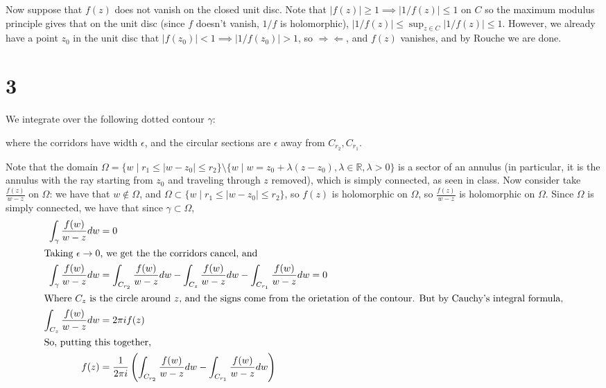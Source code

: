 \documentclass[12pt,letterpaper]{article}
\theoremstyle{definition}
\newcommand{\contra}{\Rightarrow\!\Leftarrow}
\newcommand{\R}{\mathbb{R}}
\newcommand{\incfig}[1]{}
\begin{document}
Now suppose that $f(z)$ does not vanish on the closed unit disc. Note that $|f(z)| \geq 1 \implies |1/f(z)| \leq 1$ on $C$ so the maximum modulus principle gives that on the unit disc (since $f$ doesn't vanish, $1/f$ is holomorphic), $|1/f(z)| \leq \sup_{z \in C}|1/f(z)| \leq 1$. However, we already have a point $z_{0}$ in the unit disc that $|f(z_{0})| < 1 \implies |1/f(z_{0})| > 1$, so $\contra$, and $f(z)$ vanishes, and by Rouche we are done.

\section*{3}

We integrate over the following dotted contour $\gamma$:
\begin{figure}[H]
  \centering
  \incfig{drawing-6}
\end{figure}
where the corridors have width $\epsilon$, and the circular sections are $\epsilon$ away from $C_{r_{2}}, C_{r_{1}}$.

Note that the domain $\Omega = \{w \mid r_{1} \leq |w-z_{0}| \leq r_{2}\} \setminus \{w \mid w = z_{0} + \lambda(z - z_{0}), \lambda \in \R, \lambda > 0\}$ is a sector of an annulus (in particular, it is the annulus with the ray starting from $z_{0}$ and traveling through $z$ removed), which is simply connected, as seen in class. Now consider take $\frac{f(z)}{w - z}$ on $\Omega$: we have that $w \notin \Omega$, and $\Omega \subset \{w \mid r_{1} \leq |w-z_{0}| \leq r_{2}\}$, so $f(z)$ is holomorphic on $\Omega$, so $\frac{f(z)}{w-z}$ is holomorphic on $\Omega$. Since $\Omega$ is simply connected, we have that since $\gamma \subset \Omega$,
\begin{align*}
  \int_{\gamma}\frac{f(w)}{w-z}dw &= 0 \\
  \intertext{Taking $\epsilon \rightarrow 0$, we get the the corridors cancel, and}
  \int_{\gamma}\frac{f(w)}{w-z}dw &= \int_{C_{r_{2}}}\frac{f(w)}{w-z}dw - \int_{C_{z}}\frac{f(w)}{w-z}dw - \int_{C_{r_{1}}}\frac{f(w)}{w-z}dw = 0\\
  \intertext{Where $C_{z}$ is the circle around $z$, and the signs come from the orietation of the contour. But by Cauchy's integral formula,}
  \int_{C_{z}}\frac{f(w)}{w-z}dw &= 2\pi i f(z) \\
  \intertext{So, putting this together,}
  f(z) &= \frac{1}{2\pi i}\left(\int_{C_{r_{2}}}\frac{f(w)}{w-z}dw - \int_{C_{r_{1}}}\frac{f(w)}{w-z}dw\right)
\end{align*}
\end{document}
